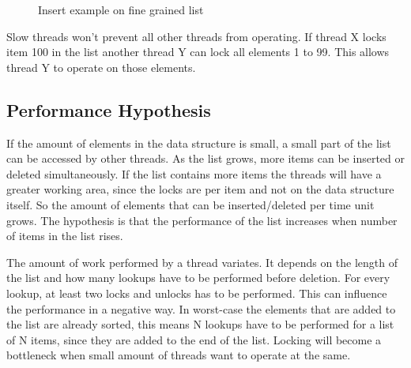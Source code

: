 \documentclass[10pt,a4paper]{article}
\begin{document}
\begin{figure}[h] 
\centerline{ 
    }
    \caption{Insert example on fine grained list}
    \label{fig:fine_insert}
\end{figure}

Slow threads won't prevent all other threads from operating. If thread X locks 
item 100 in the list another thread Y can lock all elements 1 to 99. This allows thread Y
to operate on those elements.

\subsection{Performance Hypothesis}
If the amount of elements in the data structure is small, a small part of the list can be accessed by other threads.
As the list grows, more items can be inserted or deleted simultaneously. If the
list contains more items the threads will have a greater working area, since
the locks are per item and not on the data structure itself. So the amount of
elements that can be inserted/deleted per time unit grows. The hypothesis is
that the performance of the list increases when number of items in the list
rises.

The amount of work performed by a thread variates. It depends on the length of the list and how many lookups have to be
performed before deletion. For every lookup, at least two locks and unlocks has
to be performed. This can influence the performance in a negative way. In
worst-case the elements that are added to the list are already sorted, this
means N lookups have to be performed for a list of N items, since they are
added to the end of the list. Locking will become a bottleneck when small
amount of threads want to operate at the same.
\end{document}
